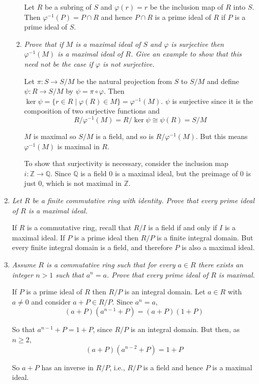 \documentclass[letterpaper, 11pt]{article}
\newcommand{\iso}{\cong}
\newcommand{\Z}{\mathbb{Z}}
\newcommand{\Q}{\mathbb{Q}}
\begin{document}
\begin{enumerate}
\begin{enumerate}
Let $R$ be a subring of $S$ and $\varphi(r) = r$ be the inclusion map of $R$ into $S$.  Then $\varphi^{-1}(P) = P \cap R$ and hence $P \cap R$ is a prime ideal of $R$ if $P$ is a prime ideal of $S$.

\item \emph{Prove that if $M$ is a maximal ideal of $S$ and $\varphi$ is surjective then $\varphi^{-1}(M)$ is a maximal ideal of $R$.  Give an example to show that this need not be the case if $\varphi$ is not surjective.}

Let $\pi: S \rightarrow S/M$ be the natural projection from $S$ to $S/M$ and define $\psi: R \rightarrow S/M$ by $\psi = \pi \circ \varphi$.  Then $\ker \psi = \{r \in R \mid \varphi(R) \in M\} = \varphi^{-1}(M)$.  $\psi$ is surjective since it is the composition of two surjective functions and
\[
R/\varphi^{-1}(M) = R/\ker \psi \iso \psi(R) = S/M
\]

$M$ is maximal so $S/M$ is a field, and so is $R/\varphi^{-1}(M)$.  But this means $\varphi^{-1}(M)$ is maximal in $R$.

To show that surjectivity is necessary, consider the inclusion map $i: \Z \rightarrow \Q$.  Since $\Q$ is a field $0$ is a maximal ideal, but the preimage of $0$ is just $0$, which is not maximal in $\Z$.

\end{enumerate}

\item \emph{Let $R$ be a finite commutative ring with identity.  Prove that every prime ideal of $R$ is a maximal ideal.}

If $R$ is a commutative ring, recall that $R/I$ is a field if and only if $I$ is a maximal ideal.  If $P$ is a prime ideal then $R/P$ is a finite integral domain.  But every finite integral domain is a field, and therefore $P$ is also a maximal ideal.

\item \emph{Assume $R$ is a commutative ring such that for every $a \in R$ there exists an integer $n > 1$ such that $a^n = a$.  Prove that every prime ideal of $R$ is maximal.}

If $P$ is a prime ideal of $R$ then $R/P$ is an integral domain.  Let $a \in R$ with $a \neq 0$ and consider $a + P \in R/P$.  Since $a^n = a$,
\[
(a+P)(a^{n-1} + P) = (a+P)(1+P)
\]

So that $a^{n-1} + P = 1 + P$, since $R/P$ is an integral domain.  But then, as $n \geq 2$,
\[
(a + P)(a^{n-2} + P) = 1 + P
\]

So $a+P$ has an inverse in $R/P$, i.e., $R/P$ is a field and hence $P$ is a maximal ideal.


\end{enumerate}
\end{document}
